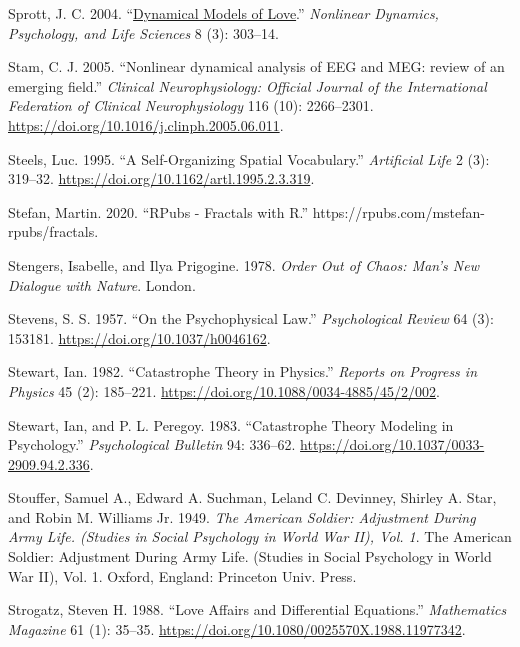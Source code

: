 \documentclass[
  a4paper,
  DIV=11,
  numbers=noendperiod,
  oneside]{scrreprt}
\newlength{\cslhangindent}
\newenvironment{CSLReferences}[2] %
 {\begin{list}{}{%
  \setlength{\itemindent}{0pt}
  \setlength{\leftmargin}{0pt}
  \setlength{\parsep}{0pt}
  \ifodd #1
   \setlength{\leftmargin}{\cslhangindent}
   \setlength{\itemindent}{-1\cslhangindent}
  \fi
  \setlength{\itemsep}{#2\baselineskip}}}
 {\end{list}}
\begin{document}
\begin{CSLReferences}{1}{0}
Sprott, J. C. 2004.
{``\href{https://www.ncbi.nlm.nih.gov/pubmed/15233877}{Dynamical Models
of Love}.''} \emph{Nonlinear Dynamics, Psychology, and Life Sciences} 8
(3): 303--14.

Stam, C. J. 2005. {``Nonlinear dynamical analysis of EEG and MEG: review
of an emerging field.''} \emph{Clinical Neurophysiology: Official
Journal of the International Federation of Clinical Neurophysiology} 116
(10): 2266--2301. \url{https://doi.org/10.1016/j.clinph.2005.06.011}.

Steels, Luc. 1995. {``A {Self-Organizing Spatial Vocabulary}.''}
\emph{Artificial Life} 2 (3): 319--32.
\url{https://doi.org/10.1162/artl.1995.2.3.319}.

Stefan, Martin. 2020. {``{RPubs} - {Fractals} with {R}.''}
https://rpubs.com/mstefan-rpubs/fractals.

Stengers, Isabelle, and Ilya Prigogine. 1978. \emph{Order {Out} of
{Chaos}: {Man}'s {New Dialogue} with {Nature}}. {London}.

Stevens, S. S. 1957. {``On the Psychophysical Law.''}
\emph{Psychological Review} 64 (3): 153181.
\url{https://doi.org/10.1037/h0046162}.

Stewart, Ian. 1982. {``Catastrophe Theory in Physics.''} \emph{Reports
on Progress in Physics} 45 (2): 185--221.
\url{https://doi.org/10.1088/0034-4885/45/2/002}.

Stewart, Ian, and P. L. Peregoy. 1983. {``Catastrophe Theory Modeling in
Psychology.''} \emph{Psychological Bulletin} 94: 336--62.
\url{https://doi.org/10.1037/0033-2909.94.2.336}.

Stouffer, Samuel A., Edward A. Suchman, Leland C. Devinney, Shirley A.
Star, and Robin M. Williams Jr. 1949. \emph{The {American} Soldier:
{Adjustment} During Army Life. ({Studies} in Social Psychology in {World
War II}), {Vol}. 1}. The {American} Soldier: {Adjustment} During Army
Life. ({Studies} in Social Psychology in {World War II}), {Vol}. 1.
{Oxford, England}: {Princeton Univ. Press}.

Strogatz, Steven H. 1988. {``Love {Affairs} and {Differential
Equations}.''} \emph{Mathematics Magazine} 61 (1): 35--35.
\url{https://doi.org/10.1080/0025570X.1988.11977342}.


\end{CSLReferences}
\end{document}

